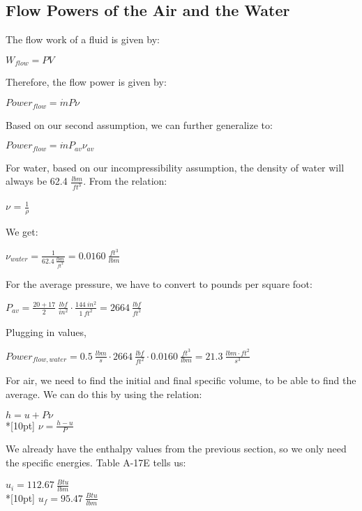 \documentclass{article}
\begin{document}
\subsection{Flow Powers of the Air and the Water}
The flow work of a fluid is given by:
\begin{center}
    \(W_{flow} = PV\)
\end{center}
Therefore, the flow power is given by:
\begin{center}
    \(Power_{flow} = \dot{m}P\nu\)
\end{center} Based on our second assumption, we can further generalize to:
\begin{center}
    \(Power_{flow} = \dot{m}P_{av}\nu_{av}\)
\end{center}
For water, based on our incompressibility assumption, the density of water will always be 62.4 \(\displaystyle \frac{lbm}{ft^3}\). From the relation:
\begin{center}
    \(\nu\) = \(\displaystyle \frac{1}{\rho}\)
\end{center}
We get:
\begin{center}
    \(\displaystyle \nu_{water} = \frac{1}{62.4 \:\frac{lbm}{ft^3}} = 0.0160 \:\frac{ft^3}{lbm}\)
\end{center}
For the average pressure, we have to convert to pounds per square foot:
\begin{center}
    \(\displaystyle P_{av} = \frac{20 + 17}{2} \:\frac{lbf}{in^2}\cdot \frac{144\:in^2}{1\:ft^2} = 2664\: \frac{lbf}{ft^2}\)
\end{center}
Plugging in values,
\begin{center}
    \(\displaystyle Power_{flow, water} = 0.5 \:\frac{lbm}{s}\cdot 2664\: \frac{lbf}{ft^2}\cdot0.0160 \:\frac{ft^3}{lbm} = 21.3 \:\frac{lbm\cdot ft^2}{s^3}\)
\end{center}
\clearpage \noindent
For air, we need to find the initial and final specific volume, to be able to find the average. We can do this by using the relation: 
\begin{center}
    \(\displaystyle h = u + P\nu\) \\*[10pt]
    \(\displaystyle \nu = \frac{h - u}{P}\)
\end{center}
We already have the enthalpy values from the previous section, so we only need the specific energies. Table A-17E tells us:
\begin{center}
    \(\displaystyle u_i = 112.67 \:\frac{Btu}{lbm}\)\\*[10pt]
    \(\displaystyle u_f = 95.47 \:\frac{Btu}{lbm}\)
\end{center}
\end{document}
